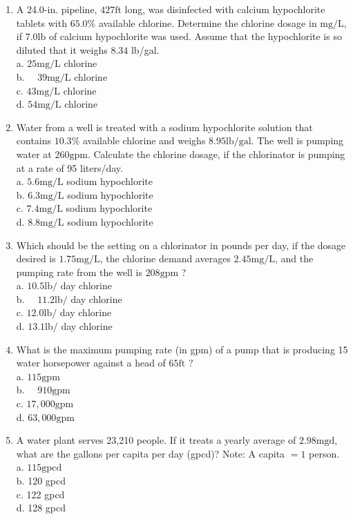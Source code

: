 \documentclass[10pt]{article}
\begin{document}
\begin{enumerate}
  \item A 24.0-in. pipeline, $427 \mathrm{ft}$ long, was disinfected with calcium hypochlorite tablets with $65.0 \%$ available chlorine. Determine the chlorine dosage in $\mathrm{mg} / \mathrm{L}$, if $7.0 \mathrm{lb}$ of calcium hypochlorite was used. Assume that the hypochlorite is so diluted that it weighs $8.34$ lb/gal.\\
a. $25 \mathrm{mg} / \mathrm{L}$ chlorine\\
b. $\quad 39 \mathrm{mg} / \mathrm{L}$ chlorine\\
c. $43 \mathrm{mg} / \mathrm{L}$ chlorine\\
d. $54 \mathrm{mg} / \mathrm{L}$ chlorine 

  \item Water from a well is treated with a sodium hypochlorite solution that contains $10.3 \%$ available chlorine and weighs $8.95 \mathrm{lb} / \mathrm{gal}$. The well is pumping water at $260 \mathrm{gpm}$. Calculate the chlorine dosage, if the chlorinator is pumping at a rate of 95 liters/day.\\
a. $5.6 \mathrm{mg} / \mathrm{L}$ sodium hypochlorite\\
b. $6.3 \mathrm{mg} / \mathrm{L}$ sodium hypochlorite\\
c. $7.4 \mathrm{mg} / \mathrm{L}$ sodium hypochlorite\\
d. $8.8 \mathrm{mg} / \mathrm{L}$ sodium hypochlorite

  \item Which should be the setting on a chlorinator in pounds per day, if the dosage desired is $1.75 \mathrm{mg} / \mathrm{L}$, the chlorine demand averages $2.45 \mathrm{mg} / \mathrm{L}$, and the pumping rate from the well is $208 \mathrm{gpm}$ ?\\
a. $10.5 \mathrm{lb} /$ day chlorine\\
b. $\quad 11.2 \mathrm{lb} /$ day chlorine\\
c. $12.0 \mathrm{lb} /$ day chlorine\\
d. $13.1 \mathrm{lb} /$ day chlorine

  \item What is the maximum pumping rate (in gpm) of a pump that is producing 15 water horsepower against a head of $65 \mathrm{ft}$ ?\\
a. $115 \mathrm{gpm}$\\
b. $\quad 910 \mathrm{gpm}$\\
c. $17,000 \mathrm{gpm}$\\
d. $63,000 \mathrm{gpm}$

  \item A water plant serves 23,210 people. If it treats a yearly average of $2.98 \mathrm{mgd}$, what are the gallons per capita per day (gpcd)? Note: A capita $=1$ person.\\
a. $115 \mathrm{gpcd}$\\
b. 120 gpcd\\
c. 122 gpcd\\
d. 128 gpcd

\end{enumerate}
\end{document}
